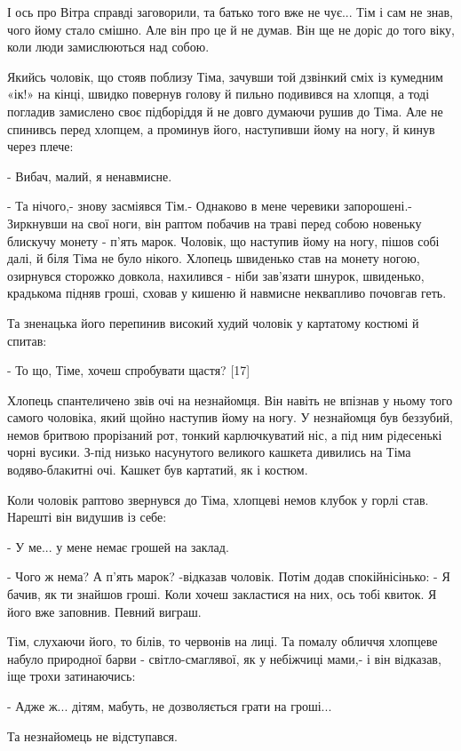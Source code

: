 І ось про Вітра справді заговорили, та батько того вже не чує... Тім і сам не
знав, чого йому стало смішно. Але він про це й не думав. Він ще не доріс до
того віку, коли люди замислюються над собою.

Якийсь чоловік, що стояв поблизу Тіма, зачувши той дзвінкий сміх із кумедним
«ік!» на кінці, швидко повернув голову й пильно подивився на хлопця, а тоді
погладив замислено своє підборіддя й не довго думаючи рушив до Тіма. Але не
спинивсь перед хлопцем, а проминув його, наступивши йому на ногу, й кинув через
плече:

- Вибач, малий, я ненавмисне.

- Та нічого,- знову засміявся Тім.- Однаково в мене черевики запорошені.-
Зиркнувши на свої ноги, він раптом побачив на траві перед собою новеньку
блискучу монету - п'ять марок. Чоловік, що наступив йому на ногу, пішов собі
далі, й біля Тіма не було нікого. Хлопець швиденько став на монету ногою,
озирнувся сторожко довкола, нахилився - ніби зав'язати шнурок, швиденько,
крадькома підняв гроші, сховав у кишеню й навмисне неквапливо почовгав геть.

Та зненацька його перепинив високий худий чоловік у картатому костюмі й спитав:

- То що, Тіме, хочеш спробувати щастя? [17]

Хлопець спантеличено звів очі на незнайомця. Він навіть не впізнав у ньому того
самого чоловіка, який щойно наступив йому на ногу. У незнайомця був беззубий,
немов бритвою прорізаний рот, тонкий карлючкуватий ніс, а під ним рідесенькі
чорні вусики. З-під низько насунутого великого кашкета дивились на Тіма
водяво-блакитні очі. Кашкет був картатий, як і костюм.

Коли чоловік раптово звернувся до Тіма, хлопцеві немов клубок у горлі став. Нарешті він видушив із себе:

- У ме... у мене немає грошей на заклад.

- Чого ж нема? А п'ять марок? -відказав чоловік. Потім додав спокійнісінько: - Я бачив, як ти знайшов гроші. Коли хочеш закластися на них, ось тобі квиток. Я його вже заповнив. Певний виграш.

Тім, слухаючи його, то білів, то червонів на лиці. Та помалу обличчя хлопцеве набуло природної барви - світло-смаглявої, як у небіжчиці мами,- і він відказав, іще трохи затинаючись:

- Адже ж... дітям, мабуть, не дозволяється грати на гроші...

Та незнайомець не відступався.


